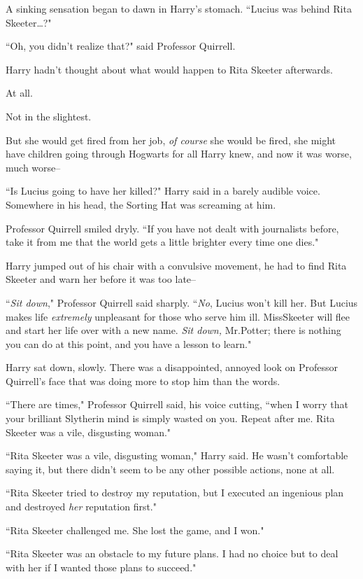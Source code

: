 A sinking sensation began to dawn in Harry's stomach. ``Lucius was behind Rita Skeeter{\ldots}?"

``Oh, you didn't realize that?" said Professor Quirrell.

Harry hadn't thought about what would happen to Rita Skeeter afterwards.

At all.

Not in the slightest.

But she would get fired from her job, \emph{of course} she would be fired, she might have children going through Hogwarts for all Harry knew, and now it was worse, much worse\---

``Is Lucius going to have her killed?" Harry said in a barely audible voice. Somewhere in his head, the Sorting Hat was screaming at him.

Professor Quirrell smiled dryly. ``If you have not dealt with journalists before, take it from me that the world gets a little brighter every time one dies."

Harry jumped out of his chair with a convulsive movement, he had to find Rita Skeeter and warn her before it was too late\---

``\emph{Sit down}," Professor Quirrell said sharply. ``\emph{No}, Lucius won't kill her. But Lucius makes life \emph{extremely} unpleasant for those who serve him ill. Miss\?Skeeter will flee and start her life over with a new name. \emph{Sit down,} Mr.\?Potter; there is nothing you can do at this point, and you have a lesson to learn."

Harry sat down, slowly. There was a disappointed, annoyed look on Professor Quirrell's face that was doing more to stop him than the words.

``There are times," Professor Quirrell said, his voice cutting, ``when I worry that your brilliant Slytherin mind is simply wasted on you. Repeat after me. Rita Skeeter was a vile, disgusting woman."

``Rita Skeeter was a vile, disgusting woman," Harry said. He wasn't comfortable saying it, but there didn't seem to be any other possible actions, none at all.

``Rita Skeeter tried to destroy my reputation, but I executed an ingenious plan and destroyed \emph{her} reputation first."

``Rita Skeeter challenged me. She lost the game, and I won."

``Rita Skeeter was an obstacle to my future plans. I had no choice but to deal with her if I wanted those plans to succeed."

